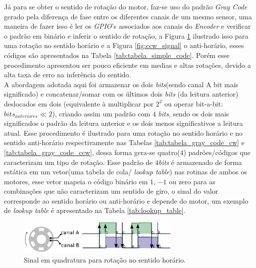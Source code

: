 

Já para se obter o sentido de rotação do motor, faz-se uso do padrão \emph{Gray Code} gerado pela diferença de fase entre os diferentes canais de um mesmo sensor, uma maneira de fazer isso é ler os \emph{GPIO}'s associados aos canais do \emph{Encoder} e verificar o padrão em binário e inferir o sentido de rotação, a Figura \ref{fig:cw_signal} ilustrado isso para uma rotação no sentido horário e a Figura \ref{fig:ccw_signal} o anti-horário, esses códigos são apresentados na Tabela \ref{tab:tabela_simple_code}. Porém esse procedimento apresentou ser pouco eficiente em medias e altas rotações, devido a alta taxa de erro na inferência do sentido. \\


A abordagem adotada aqui foi armazenar os dois \emph{bits}(sendo canal A bit mais significado) e concatenar/somar com os últimos dois \emph{bits} (da leitura anterior) deslocados em dois (equivalente à multiplicar por $2^2$ ou operar bit-a-bit: $bits_{anteriores} \ll 2$), criando assim um padrão com $4$ \emph{bits}, sendo os dois mais significados o padrão da leitura anterior e os dois menos significativos a leitura atual. Esse procedimento é ilustrado para uma rotação no sentido horário e no sentido anti-horário respectivamente nas Tabelas \ref{tab:tabela_gray_code_cw} e \ref{tab:tabela_gray_code_ccw}, dessa forma gera-se quatro($4$) padrões/códigos que caracterizam um tipo de rotação. Esse padrão de $4$\emph{bits} é armazenado de forma estática em um vetor(uma tabela de cola/ \emph{lookup table}) nas rotinas de ambos os motores, esse vetor mapeia o código binário em $1$, $-1$ ou zero para as combinações que não caracterizam um sentido de giro, o sinal do valor corresponde ao sentido horário ou anti-horário e depende do motor, um exemplo de \emph{lookup table} é apresentado na Tabela \ref{tab:lookup_table}.

\begin{figure}[H]
    \centering
    \includegraphics[width=0.7\textwidth]{imagens/ilustracoes/sinal_enquadratura_sentido_CW.eps}
    \caption{Sinal em quadratura para rotação no sentido horário.}
    \label{fig:cw_signal}
\end{figure}



